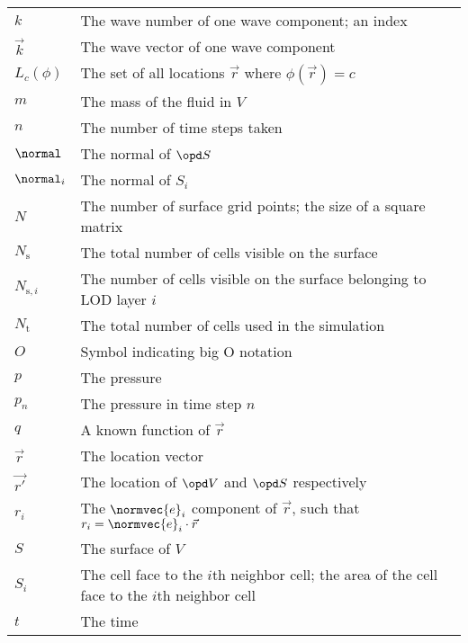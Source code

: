 \begin{center}
\begin{longtabu}{l X}
        $k$                 & The wave number of one wave component; an index \\
        $\vec{k}$           & The wave vector of one wave component \\
        $L_c(\phi)$         & The set of all locations $\vec{r}$ where $\phi(\vec{r}) = c$ \\
        $m$                 & The mass of the fluid in $V$ \\
        $n$                 & The number of time steps taken \\
        $\normal$           & The normal of $\opd S$ \\
        $\normal_i$         & The normal of $S_i$ \\
        $N$                 & The number of surface grid points; the size of a square matrix \\
        $N_{\text{s}}$      & The total number of cells visible on the surface \\
        $N_{\text{s},i}$    & The number of cells visible on the surface belonging to LOD layer $i$ \\
        $N_{\text{t}}$      & The total number of cells used in the simulation \\
        $O$                 & Symbol indicating big O notation \\
        $p$                 & The pressure \\
        $p_n$               & The pressure in time step $n$ \\
        $q$                 & A known function of $\vec{r}$ \\
        $\vec{r}$           & The location vector \\
        $\vec{r'}$          & The location of $\opd V$ and $\opd S$ respectively \\
        $r_i$               & The $\normvec{e}_i$ component of $\vec{r}$,
                              such that $r_i = \normvec{e}_i\cdot\vec{r}$ \\
        $S$                 & The surface of $V$ \\
        $S_i$               & The cell face to the $i$th neighbor cell;
                              the area of the cell face to the $i$th neighbor cell \\
        $t$                 & The time \\

\end{longtabu}
\end{center}
